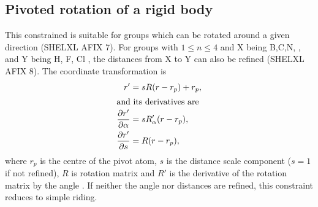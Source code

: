 \documentclass[pdf]{iucr}
\newcommand{\partialder}[2]{\frac{\partial #1}{\partial #2}}
\begin{document}
\subsection{Pivoted rotation of a rigid body}
\label{sec:pivoted:rotated:group}
This constrained is suitable for groups which can be rotated around a given direction (SHELXL AFIX 7). For groups  with $1\leq n \leq 4$ and X being B,C,N, , and Y being H, F, Cl , the distances from X to Y can also be refined (SHELXL AFIX 8). The coordinate transformation is
\begin{align}
r' &= sR(r-r_p) + r_{p},\\
\shortintertext{and its derivatives are}
\partialder{r'}{\alpha} &= sR'_\alpha(r - r_p),\\ 
\partialder{r'}{s} &= R(r-r_p),
\end{align}
where $r_p$ is the centre of the pivot atom, $s$ is the distance scale component ($s=1$ if not refined), $R$ is rotation matrix  and $R'$ is the derivative of the rotation matrix by the angle . If neither the angle nor distances are refined, this constraint reduces to simple riding.
\end{document}
